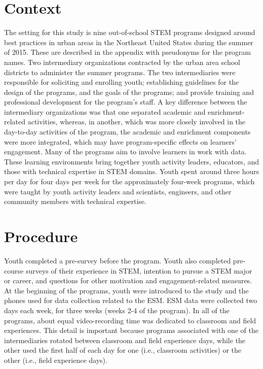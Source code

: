 \documentclass[]{msu-thesis}
\theoremstyle{definition}
\theoremstyle{definition}
\theoremstyle{definition}
\theoremstyle{remark}
\begin{document}
\section{Context}\label{context}

The setting for this study is nine out-of-school STEM programs designed
around best practices in urban areas in the Northeast United States
during the summer of 2015. These are described in the appendix with
pseudonyms for the program names. Two intermediary organizations
contracted by the urban area school districts to administer the summer
programs. The two intermediaries were responsible for soliciting and
enrolling youth; establishing guidelines for the design of the programs,
and the goals of the programs; and provide training and professional
development for the program's staff. A key difference between the
intermediary organizations was that one separated academic and
enrichment-related activities, whereas, in another, which was more
closely involved in the day-to-day activities of the program, the
academic and enrichment components were more integrated, which may have
program-specific effects on learners' engagement. Many of the programs
aim to involve learners in work with data. These learning environments
bring together youth activity leaders, educators, and those with
technical expertise in STEM domains. Youth spent around three hours per
day for four days per week for the approximately four-week programs,
which were taught by youth activity leaders and scientists, engineers,
and other community members with technical expertise.

\section{Procedure}\label{procedure}

Youth completed a pre-survey before the program. Youth also completed
pre-course surveys of their experience in STEM, intention to pursue a
STEM major or career, and questions for other motivation and
engagement-related measures. At the beginning of the programs, youth
were introduced to the study and the phones used for data collection
related to the ESM. ESM data were collected two days each week, for
three weeks (weeks 2-4 of the program). In all of the programs, about
equal video-recording time was dedicated to classroom and field
experiences. This detail is important because programs associated with
one of the intermediaries rotated between classroom and field experience
days, while the other used the first half of each day for one (i.e.,
classroom activities) or the other (i.e., field experience days).
\end{document}
